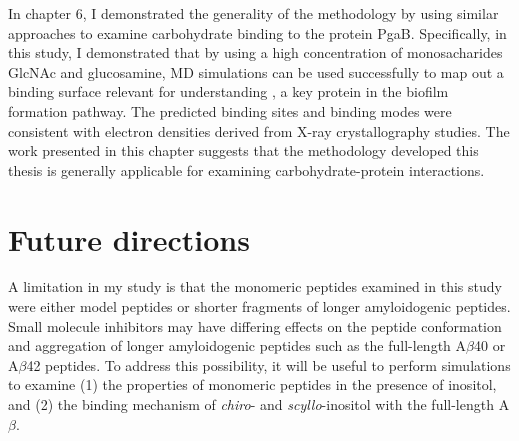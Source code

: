 
In chapter 6, I demonstrated the generality of the methodology by using similar approaches to examine carbohydrate binding to the protein PgaB. Specifically, in this study, I demonstrated that by using a high concentration of monosacharides GlcNAc and glucosamine, MD simulations can be used successfully to map out a binding surface relevant for understanding , a key protein in the biofilm formation pathway. The predicted binding sites and binding modes were consistent with electron densities derived from X-ray crystallography studies.  The work presented in this chapter suggests that the methodology developed this thesis is generally applicable for examining carbohydrate-protein interactions.

\section{Future directions}

A limitation in my study is that the monomeric peptides examined in this study were either model peptides or shorter fragments of longer amyloidogenic peptides. Small molecule inhibitors may have differing effects on the peptide conformation and aggregation of longer amyloidogenic peptides such as the full-length A$\beta$40 or A$\beta$42 peptides. To address this possibility, it will be useful to perform simulations to examine (1) the properties of monomeric peptides in the presence of inositol, and (2) the binding mechanism of \textit{chiro}- and \textit{scyllo}-inositol with the full-length A$\beta$.

